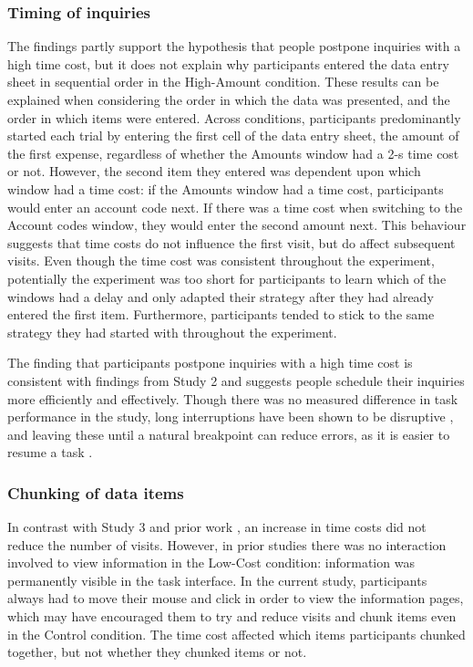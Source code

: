 \subsubsection{Timing of inquiries}
The findings partly support the hypothesis that people postpone inquiries with a high time cost, but it does not explain why participants entered the data entry sheet in sequential order in the High-Amount condition. 
These results can be explained when considering the order in which the data was presented, and the order in which items were entered. Across conditions, participants predominantly started each trial by entering the first cell of the data entry sheet, the amount of the first expense, regardless of whether the Amounts window had a 2-s time cost or not. However, the second item they entered was dependent upon which window had a time cost: if the Amounts window had a time cost, participants would enter an account code next. If there was a time cost when switching to the Account codes window, they would enter the second amount next.
This behaviour suggests that time costs do not influence the first visit, but do affect subsequent visits. Even though the time cost was consistent throughout the experiment, potentially the experiment was too short for participants to learn which of the windows had a delay and only adapted their strategy after they had already entered the first item. Furthermore, participants tended to stick to the same strategy they had started with throughout the experiment.

The finding that participants postpone inquiries with a high time cost is consistent with findings from Study 2 and suggests people schedule their inquiries more efficiently and effectively. Though there was no measured difference in task performance in the study, long interruptions have been shown to be disruptive \citep{Altmann2017, Monk2008}, and leaving these until a natural breakpoint can reduce errors, as it is easier to resume a task \citep{Gould2013a, Iqbal2005}.

\subsubsection{Chunking of data items}
In contrast with Study 3 and prior work \citep{Gray2006}, an increase in time costs did not reduce the number of visits. However, in prior studies there was no interaction involved to view information in the Low-Cost condition: information was permanently visible in the task interface. In the current study, participants always had to move their mouse and click in order to view the information pages, which may have encouraged them to try and reduce visits and chunk items even in the Control condition. The time cost affected which items participants chunked together, but not whether they chunked items or not.

